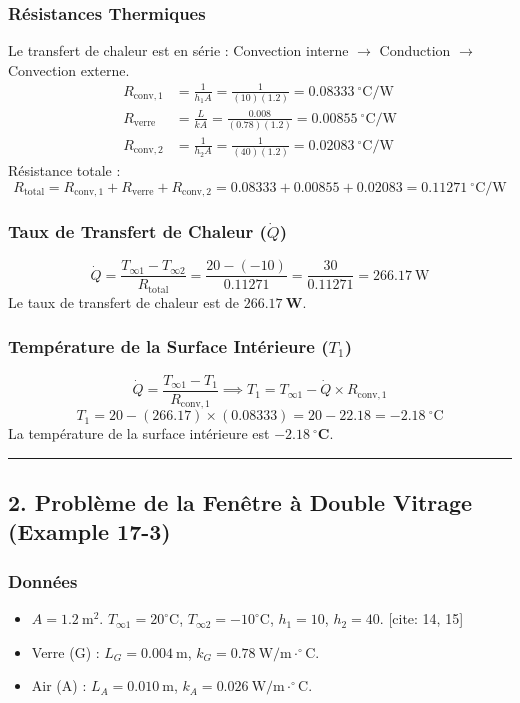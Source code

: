 \documentclass{rapportECL}
\begin{document}
\subsubsection*{Résistances Thermiques}
Le transfert de chaleur est en série : Convection interne $\rightarrow$ Conduction $\rightarrow$ Convection externe.
\begin{align*}
    R_{\text{conv}, 1} &= \frac{1}{h_1 A} = \frac{1}{(10)(1.2)} = 0.08333 \ ^\circ\text{C/W} \\
    R_{\text{verre}} &= \frac{L}{k A} = \frac{0.008}{(0.78)(1.2)} = 0.00855 \ ^\circ\text{C/W} \\
    R_{\text{conv}, 2} &= \frac{1}{h_2 A} = \frac{1}{(40)(1.2)} = 0.02083 \ ^\circ\text{C/W}
\end{align*}
Résistance totale :
$$R_{\text{total}} = R_{\text{conv}, 1} + R_{\text{verre}} + R_{\text{conv}, 2} = 0.08333 + 0.00855 + 0.02083 = 0.11271 \ ^\circ\text{C/W}$$

\subsubsection*{Taux de Transfert de Chaleur ($\dot{Q}$)}
$$\dot{Q} = \frac{T_{\infty 1} - T_{\infty 2}}{R_{\text{total}}} = \frac{20 - (-10)}{0.11271} = \frac{30}{0.11271} = 266.17 \ \text{W}$$
Le taux de transfert de chaleur est de $\mathbf{266.17 \ \text{W}}$.

\subsubsection*{Température de la Surface Intérieure ($T_1$)}
$$\dot{Q} = \frac{T_{\infty 1} - T_1}{R_{\text{conv}, 1}} \implies T_1 = T_{\infty 1} - \dot{Q} \times R_{\text{conv}, 1}$$
$$T_1 = 20 - (266.17) \times (0.08333) = 20 - 22.18 = -2.18 \ ^\circ\text{C}$$
La température de la surface intérieure est $\mathbf{-2.18 \ ^\circ\text{C}}$.

\vspace{0.5cm}
\hrule
\vspace{0.5cm}

\subsection*{2. Problème de la Fenêtre à Double Vitrage (Example 17-3)}
\subsubsection*{Données}
\begin{itemize}
    \item $A = 1.2 \ \text{m}^2$. $T_{\infty 1}=20^\circ\text{C}$, $T_{\infty 2}=-10^\circ\text{C}$, $h_1=10$, $h_2=40$. [cite: 14, 15]
    \item Verre (G) : $L_G = 0.004 \ \text{m}$, $k_G = 0.78 \ \text{W/m}\cdot^\circ\text{C}$. 
    \item Air (A) : $L_A = 0.010 \ \text{m}$, $k_A = 0.026 \ \text{W/m}\cdot^\circ\text{C}$. 
\end{itemize}
\end{document}

